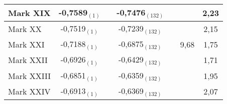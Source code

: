 {{\begin{tabular}{l||c|c|c|c||c|c}
    \hline
    Mark XIX & -0,7589$_{(1)}$  & & -0,7476$_{(132)}$ & & & 2,23 \\
    \hline
    Mark XX & -0,7519$_{(1)}$ & & -0,7239$_{(132)}$ & & & 2,15 \\
    \hline
    Mark XXI & -0,7188$_{(1)}$ & & -0,6875$_{(132)}$ & & 9,68 & 1,75 \\
    \hline
    Mark XXII & -0,6926$_{(1)}$ & & -0,6429$_{(132)}$ & & & 1,71 \\
    \hline
    Mark XXIII & -0,6851$_{(1)}$ & & -0,6359$_{(132)}$ & & & 1,95 \\
    \hline
    Mark XXIV & -0,6913$_{(1)}$ & & -0,6369$_{(132)}$ & & & 2,07 \\
  \end{tabular}%
  }%
  }

  \restoregeometry
